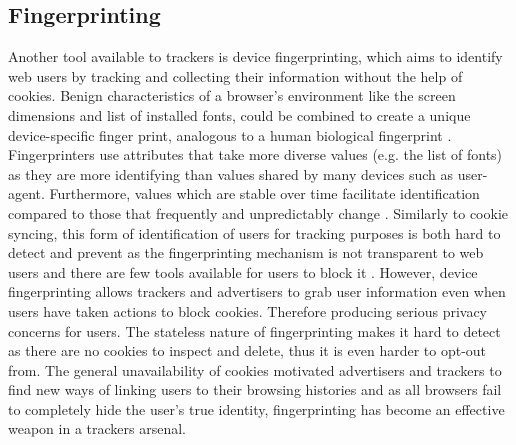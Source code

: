 \documentclass{article}
\begin{document}
\subsection{Fingerprinting} \label{fingerprinting}
Another tool available to trackers is device fingerprinting, which aims to identify web users by tracking and collecting their information without the help of cookies. Benign characteristics of a browser's environment like the screen dimensions and list of installed fonts, could be combined to create a unique device-specific finger print, analogous to a human biological fingerprint \parencite{uniqueBrowser}. Fingerprinters use attributes that take more diverse values (e.g. the list of fonts) as they are more identifying than values shared by many devices such as user-agent. Furthermore, values which are stable over time facilitate identification compared to those that frequently and unpredictably change \parencite{dustingFP}. Similarly to cookie syncing, this form of identification of users for tracking purposes is both hard to detect and prevent as the fingerprinting mechanism is not transparent to web users and there are few tools available for users to block it \parencite{uniqueBrowser}. However, device fingerprinting allows trackers and advertisers to grab user information even when  users have taken actions to block cookies. Therefore producing serious privacy concerns for users. The stateless nature of fingerprinting makes it hard to detect as there are no cookies to inspect and delete, thus it is even harder to opt-out from. The general unavailability of cookies motivated advertisers and trackers to find new ways of linking users to their browsing histories and as all browsers fail to completely hide the user's true identity, fingerprinting has become an effective weapon in a trackers arsenal. \newline 
\end{document}
